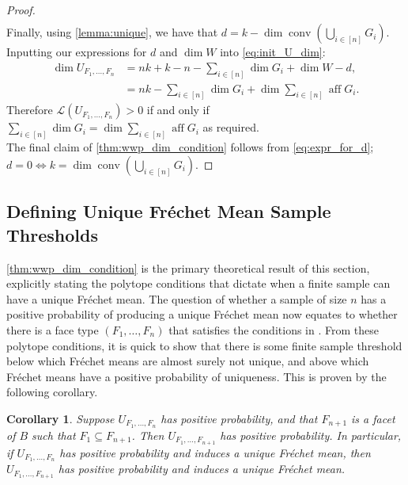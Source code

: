 \documentclass[10pt]{article}
\newtheorem{corollary}[theorem]{Corollary}
\theoremstyle{definition}
\theoremstyle{remark}
\renewcommand{\L}{\mathcal{L}}
\newcommand{\CType}{F_1,\dots,F_n}
\DeclareMathOperator{\conv}{conv}
\DeclareMathOperator{\aff}{aff}
\begin{document}
\begin{proof}
\begin{align*}
		\end{align*}
		Finally, using \cref{lemma:unique}, we have that $d = k - \dim \conv \left(\textstyle \bigcup_{i \in [n]} G_i \right)$.
		Inputting our expressions for $d$ and $\dim W$ into \cref{eq:init_U_dim}:
		\begin{align*}
			\dim U_{\CType} &= nk + k - n - \textstyle \sum_{i \in [n]} \dim G_i + \dim W - d, \\
			&= nk - \textstyle \sum_{i \in [n]} \dim G_i + \dim \sum_{i \in [n]} \aff G_i.
		\end{align*}
		Therefore $\L(U_{\CType}) > 0$ if and only if $\textstyle \sum_{i \in [n]} \dim G_i = \dim \sum_{i \in [n]} \aff G_i$ as required. \\
		The final claim of \cref{thm:wwp_dim_condition} follows from \cref{eq:expr_for_d}; $d=0 \Leftrightarrow k = \dim \conv \left( \bigcup_{i \in [n]} G_i \right)$.
	\end{proof}
	
	\subsection{Defining Unique Fr\'echet Mean Sample Thresholds}
	
	\cref{thm:wwp_dim_condition} is the primary theoretical result of this section, explicitly stating the polytope conditions that dictate when a finite sample can have a unique Fr\'echet mean. The question of whether a sample of size $n$ has a positive probability of producing a unique Fr\'echet mean now equates to whether there is a face type $(\CType)$ that satisfies the conditions in . From these polytope conditions, it is quick to show that there is some finite sample threshold below which Fr\'echet means are almost surely not unique, and above which Fr\'echet means have a positive probability of uniqueness. This is proven by the following corollary.
	
	\begin{corollary}\label{cor:inductive_result}
		Suppose $U_{\CType}$ has positive probability, and that $F_{n+1}$ is a facet of $B$ such that $F_1 \subseteq F_{n+1}$. Then $U_{F_1,\dots,F_{n+1}}$ has positive probability. In particular, if $U_{\CType}$ has positive probability and induces a unique Fr\'echet mean, then $U_{F_1,\dots,F_{n+1}}$ has positive probability and induces a unique Fr\'echet mean.
	\end{corollary}
	
\end{document}
